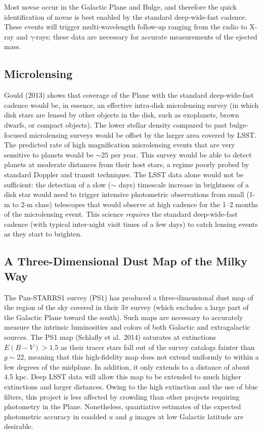 Most novae occur in the Galactic Plane and Bulge, and therefore the quick identification of novae is best enabled by the standard deep-wide-fast cadence. 
These events will trigger multi-wavelength follow-up ranging from the radio to X-ray and $\gamma$-rays; these data are necessary for accurate measurements of 
the ejected mass.

\subsection{Microlensing}

Gould (2013) shows that coverage of the Plane with the standard deep-wide-fast cadence would be, in essence, an effective intra-disk microlensing survey (in 
which disk stars are lensed by other objects in the disk, such as exoplanets, brown dwarfs, or compact objects). The lower stellar density compared to past 
bulge-focused microlensing surveys would be offset by the larger area covered by LSST. The predicted rate of high magnification microlensing events that are 
very sensitive to planets would be $\sim 25$ per year. This survey would be able to detect planets at moderate distances from their host stars, a regime 
poorly probed by standard Doppler and transit techniques. The LSST data alone would not be sufficient: the detection of a slow ($\sim$ days) timescale 
increase in brightness of a disk star would need to trigger intensive photometric observations from small (1-m to 2-m class) telescopes that would observe at 
high cadence for the 1--2 months of the microlensing event. This science \emph{requires} the standard deep-wide-fast cadence (with typical inter-night visit 
times of a few days) to catch lensing events as they start to brighten.


\subsection{A Three-Dimensional Dust Map of the Milky Way}

The Pan-STARRS1 survey (PS1) has produced a three-dimensional dust map of the region of the sky covered in their 3$\pi$ survey (which excludes a large part 
of the Galactic Plane toward the south). Such maps are necessary to accurately measure the intrinsic luminosities and colors of both Galactic and 
extragalactic sources. The PS1 map (Schlafly et al.~2014) saturates at extinctions $E(B-V) > 1.5$ as their tracer stars fall out of the survey catalogs 
fainter than $g\sim 22$, meaning that this high-fidelity map does not extend uniformly to within a few degrees of the midplane. In addition, it only extends 
to a distance of about 4.5 kpc. Deep LSST data will allow this map to be extended to much higher extinctions and larger distances. Owing to the high 
extinction and the use of blue filters, this project is less affected by crowding than other projects requiring photometry in the Plane. Nonetheless, 
quantiative estimates of the expected photometric accuracy in coadded $u$ and $g$ images at low Galactic latitude are desirable.


